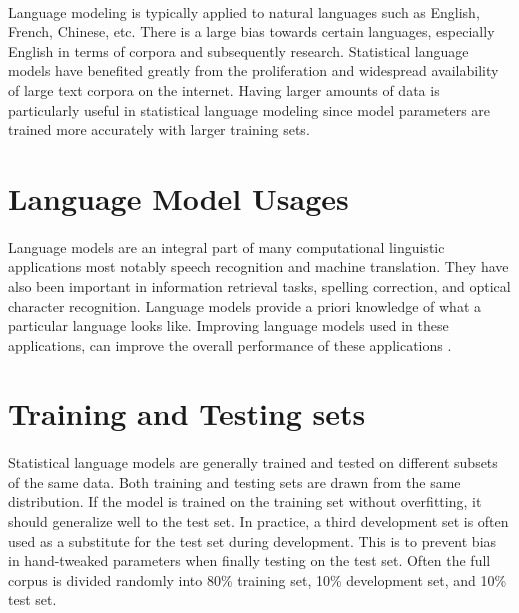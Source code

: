\paragraph{}
Language modeling is typically applied to natural languages such as English, French, Chinese, etc. There is a large bias towards certain languages, especially English in terms of corpora and subsequently research. Statistical language models have benefited greatly from the proliferation and widespread availability of large text corpora on the internet.  Having larger amounts of data is particularly useful in statistical language modeling since model parameters are trained more accurately with larger training sets. 

\section{Language Model Usages}
\paragraph{}
Language models are an integral part of many computational linguistic applications most notably speech recognition and machine translation. They have also been important in information retrieval tasks, spelling correction, and optical character recognition. Language models provide a priori knowledge of what a particular language looks like. Improving language models used in these applications, can improve the overall performance of these applications \cite{Jurafsky2009}. 

\section{Training and Testing sets}
\paragraph{}
Statistical language models are generally trained and tested on different subsets of the same data. Both training and testing sets are drawn from the same distribution. If the model is trained on the training set without overfitting, it should generalize well to the test set. In practice, a third development set is often used as a substitute for the test set during development. This is to prevent bias in hand-tweaked parameters when finally testing on the test set. Often the full corpus is divided randomly into 80\% training set, 10\% development set, and 10\% test set.

